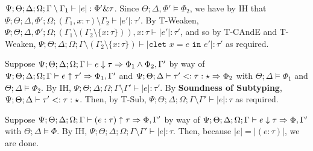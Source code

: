    $\Psi ; \Theta ; \Delta ; \Omega ; \Gamma \setminus \Gamma_1 \vdash |e| : \Phi' \& \tau$. Since $\Theta; \Delta,\Phi' \vDash \Phi_2$, we have by IH that
   $\Psi ; \Theta ; \Delta, \Phi' ; \Omega ; (\Gamma_1, x : \tau) \setminus \Gamma_2 \vdash |e'| : \tau'$. By T-Weaken,
   $\Psi ; \Theta ; \Delta, \Phi' ; \Omega ; (\Gamma_1 \setminus (\Gamma_2 \setminus \{x : \tau\})), x : \tau\vdash |e'| : \tau'$, and so by T-CAndE and T-Weaken, 
   $\Psi ; \Theta ; \Delta ; \Omega ; \Gamma \setminus (\Gamma_2 \setminus \{x : \tau\}) \vdash |\texttt{clet } x = e \texttt{ in } e'| : \tau'$ as required.
  
 
  \item[AT-Sub] Suppose $\Psi ; \Theta ; \Delta ; \Omega ; \Gamma \vdash e \downarrow \tau \Rightarrow \Phi_1 \wedge \Phi_2,\Gamma'$ by way of $\Psi ; \Theta ; \Delta ; \Omega ; \Gamma \vdash e \uparrow \tau' \Rightarrow \Phi_1,\Gamma'$ and $\Psi;\Theta;\Delta \vdash \tau' <: \tau : \star \Rightarrow \Phi_2$ with $\Theta ; \Delta \vDash \Phi_1$ and $\Theta ; \Delta \vDash \Phi_2$. By IH,  $\Psi ; \Theta ; \Delta ; \Omega ; \Gamma \setminus \Gamma' \vdash |e| : \tau'$. By \textbf{Soundness of Subtyping}, $\Psi;\Theta;\Delta \vdash \tau' <: \tau : \star$. Then, by T-Sub, $\Psi ; \Theta ; \Delta ; \Omega ; \Gamma\setminus \Gamma' \vdash |e| : \tau$ as required.
  
  
  \item[AT-Anno] Suppose $\Psi ; \Theta ; \Delta ; \Omega ; \Gamma \vdash (e : \tau) \uparrow \tau \Rightarrow \Phi,\Gamma'$ by way of $\Psi ; \Theta ; \Delta ; \Omega ; \Gamma \vdash e \downarrow \tau \Rightarrow \Phi,\Gamma'$ with $\Theta ; \Delta \vDash \Phi$. By IH, $\Psi ; \Theta ; \Delta ; \Omega ; \Gamma \setminus \Gamma' \vdash |e| : \tau$. Then, because $|e| = |(e : \tau)|$, we are done.
\fi